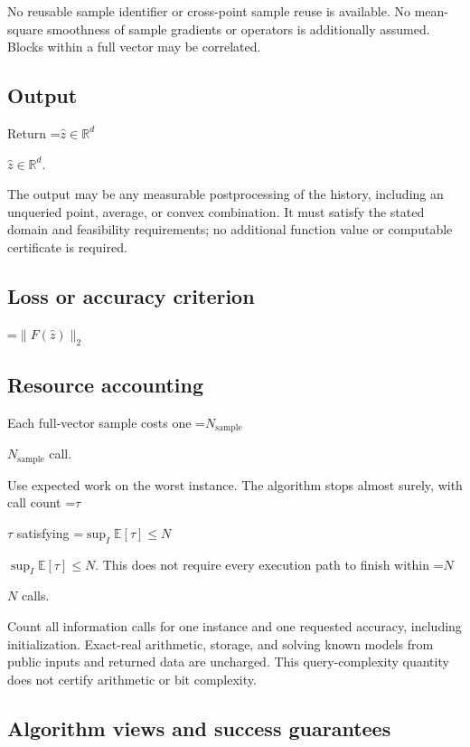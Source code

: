\documentclass[10pt,a4paper]{article}
\newcommand{\AtlasMath}[1]{\par\begingroup\centering\setbox0=\hbox{$\displaystyle #1$}\ifdim\wd0>1.4\linewidth\typeout{ATLAS WIDE FORMULA: \the\wd0}\fi\ifdim\wd0>\linewidth\resizebox{\linewidth}{!}{\box0}\else\box0\fi\par\endgroup}
\newcommand{\AtlasInlineMath}[1]{\begingroup\setbox0=\hbox{$#1$}\ifdim\wd0>.4\linewidth\endgroup\AtlasMath{#1}\else\endgroup$#1$\fi}
\begin{document}
No reusable sample identifier or cross-point sample reuse is available. No mean-square smoothness of sample gradients or operators is additionally assumed. Blocks within a full vector may be correlated.



\subsection{Output}


Return \AtlasInlineMath{\widehat{z}\in\mathbb{R}^d}.



The output may be any measurable postprocessing of the history, including an unqueried point, average, or convex combination. It must satisfy the stated domain and feasibility requirements; no additional function value or computable certificate is required.



\subsection{Loss or accuracy criterion}



\AtlasMath{\|F(\widehat{z})\|_2}




\subsection{Resource accounting}


Each full-vector sample costs one \AtlasInlineMath{N_{\mathrm{sample}}} call.



Use expected work on the worst instance. The algorithm stops almost surely, with call count \AtlasInlineMath{\tau} satisfying \AtlasInlineMath{\sup_I\mathbb{E}[\tau]\le N}. This does not require every execution path to finish within \AtlasInlineMath{N} calls.



Count all information calls for one instance and one requested accuracy, including initialization. Exact-real arithmetic, storage, and solving known models from public inputs and returned data are uncharged. This query-complexity quantity does not certify arithmetic or bit complexity.



\subsection{Algorithm views and success guarantees}
\end{document}
